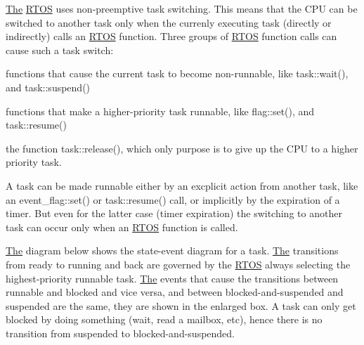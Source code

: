 \hyperlink{class_the}{The} \hyperlink{class_r_t_o_s}{R\+T\+OS} uses non-\/preemptive task switching. This means that the C\+PU can be switched to another task only when the currenly executing task (directly or indirectly) calls an \hyperlink{class_r_t_o_s}{R\+T\+OS} function. Three groups of \hyperlink{class_r_t_o_s}{R\+T\+OS} function calls can cause such a task switch\+:


\begin{DoxyEnumerate}
\item functions that cause the current task to become non-\/runnable, like task\+::wait(), and task\+::suspend()
\item functions that make a higher-\/priority task runnable, like flag\+::set(), and task\+::resume()
\item the function task\+::release(), which only purpose is to give up the C\+PU to a higher priority task.
\end{DoxyEnumerate}

A task can be made runnable either by an excplicit action from another task, like an event\+\_\+flag\+::set() or task\+::resume() call, or implicitly by the expiration of a timer. But even for the latter case (timer expiration) the switching to another task can occur only when an \hyperlink{class_r_t_o_s}{R\+T\+OS} function is called.

\hyperlink{class_the}{The} diagram below shows the state-\/event diagram for a task. \hyperlink{class_the}{The} transitions from ready to running and back are governed by the \hyperlink{class_r_t_o_s}{R\+T\+OS} always selecting the highest-\/priority runnable task. \hyperlink{class_the}{The} events that cause the transitions between runnable and blocked and vice versa, and between blocked-\/and-\/suspended and suspended are the same, they are shown in the enlarged box. A task can only get blocked by doing something (wait, read a mailbox, etc), hence there is no transition from suspended to blocked-\/and-\/suspended. 